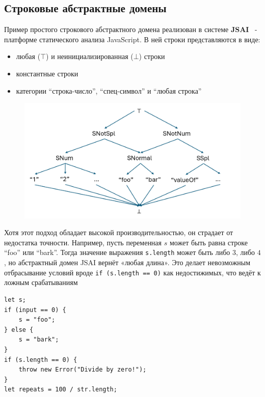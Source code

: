 \subsection{Строковые абстрактные домены}

Пример простого строкового абстрактного домена реализован в системе \textbf{JSAI}~\cite{guha2012jsai} - платформе статического анализа JavaScript. В ней строки представляются в виде:
\begin{itemize}
    \item любая ($\top$) и неинициализированная ($\bot$) строки
    \item константные строки
    \item категории ``строка-число'', ``спец-символ'' и ``любая строка''
\end{itemize}

\begin{figure}[H]
\includegraphics[width=\textwidth]{images/jsai-string-lattice.png}\hfill
\end{figure}


Хотя этот подход обладает высокой производительностью, он страдает от недостатка точности. Например, пусть переменная $s$ может быть равна строке ``foo'' или ``bark''. Тогда значение выражения \texttt{s.length} может быть либо $3$, либо $4$, но абстрактный домен JSAI вернёт «любая длина». Это делает невозможным отбрасывание условий вроде \texttt{if (s.length == 0)} как недостижимых, что ведёт к ложным срабатываниям

\newpage
\begin{lstlisting}[caption={Пример недостаточной точности в строковом домене JSAI}]
let s;
if (input == 0) {
    s = "foo";
} else {
    s = "bark";
}
if (s.length == 0) {
    throw new Error("Divide by zero!");
}
let repeats = 100 / str.length;
\end{lstlisting}

